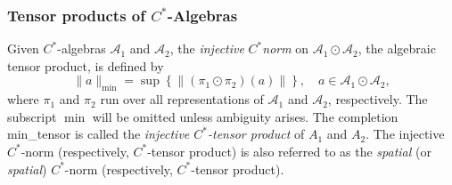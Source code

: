 \subsubsection{Tensor products of $C^*$-Algebras}


\begin{definition} \label{def:min_tensor_c*}
  Given $C^*$-algebras $\mathscr{A}_1$ and $\mathscr{A}_2$, the \emph{injective} $C^*$\emph{norm} on $\mathscr{A}_1 \odot \mathscr{A}_2$, the algebraic tensor product, is defined by
\[
\|a\|_{\min} = \sup \left\{ \|(\pi_1 \odot \pi_2)(a)\| \right\},
\quad a \in \mathscr{A}_1 \odot \mathscr{A}_2,
\]
where $\pi_1$ and $\pi_2$ run over all  representations of $\mathscr{A}_1$ and $\mathscr{A}_2$, respectively. The subscript $\min$  will be omitted unless ambiguity arises.
The completion \gls{min_tensor} is called the \emph{injective $C^*$-tensor product} of $A_1$ and $A_2$. The injective  $C^*$-norm (respectively, $C^*$-tensor product) is also referred to as the \emph{spatial} (or \emph{spatial}) $C^*$-norm (respectively, $C^*$-tensor product).
\end{definition}

